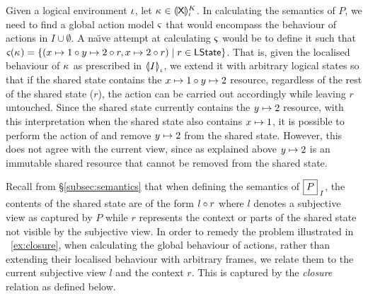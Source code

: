 \begin{example}[]
Given a logical environment $\lenv$, let $\ca{} \in \semK[\lenv]{\token{X}}$. In calculating the semantics of $P$, we need to find a global action model $\amod{}$ that would encompass the behaviour of actions in $I \cup \emptyset$. A na\"\i ve attempt at calculating $\amod{}$ would be to define it such that $\amod{}(\ca{}) = \left\{(\cell{x}{1} \composeL \cell{y}{2} \composeL r, \cell{x}{2} \composeL r ) \mid r \in \LStates \right\}$. That is, given the localised behaviour of $\ca{}$ as prescribed in $\semI[\lenv]{I}$, we extend it with arbitrary logical states so that if the shared state contains the $\cell{x}{1} \composeL \cell{y}{2}$ resource, regardless of the rest of the shared state ($r$), the action can be carried out accordingly while leaving $r$ untouched. Since the shared state currently contains the $\cell{y}{2}$ resource, with this interpretation when the shared state also contains $\cell{x}{1}$, it is possible to perform the action of  and remove $\cell{y}{2}$ from the shared state. However, this does not agree with the current view, since as explained above $\cell{y}{2}$ is an immutable shared resource that cannot be removed from the shared state. 
\end{example}
Recall from \S\ref{subsec:semantics} that when defining the semantics of $\shared{P}{I}$, the contents of the shared state are of the form $l \composeL r$ where $l$ denotes a subjective view as captured by $P$ while $r$ represents the context or parts of the shared state not visible by the subjective view. In order to remedy the problem illustrated in \ex~\ref{ex:closure}, when calculating the global behaviour of actions, rather than extending their localised behaviour with arbitrary frames, we relate them to the current subjective view $l$ and the context $r$. This is captured by the \emph{closure} relation as defined below.
